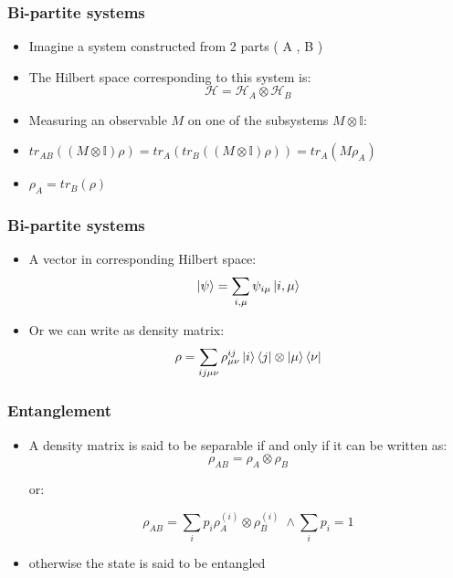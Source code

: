 \documentclass[11pt]{beamer}
\begin{document}
\begin{frame}
\frametitle{Bi-partite systems}

\begin{itemize}
 \item  Imagine a system constructed from 2 parts  ( A , B ) 
 \item  The Hilbert space corresponding to this system is:
    $$\mathcal{H} = \mathcal{H}_A \otimes \mathcal{H}_B $$
 \item  Measuring an observable $M$ on one of the subsystems $M \otimes     \mathbb{I} $:
 \item  $tr_{AB}((M \otimes \mathbb{I})\rho) = tr_A(tr_B((M \otimes \mathbb{I} )\rho)) = tr_A(M \rho_A)$
 \item $\rho_A  = tr_B(\rho)$
\end{itemize}

\end{frame}

\begin{frame}
\frametitle{Bi-partite systems}

\begin{itemize}
 \item  A vector in corresponding Hilbert space:
    $$\ket{\psi} = \sum_{i,\mu} \psi_{i\mu} \ket{i,\mu}$$
 \item  Or we can write as density matrix:
    $$\rho = \sum_{ij\mu\nu} \rho^{ij}_{\mu\nu} \ket{i}\bra{j} \otimes \ket{\mu}\bra{\nu} $$
\end{itemize}

\end{frame}

\begin{frame}
\frametitle{Entanglement}

\begin{itemize}
 \item  A density matrix is said to be separable if and only if it can be written as:
 $$\rho_{AB} = \rho_A \otimes \rho_B$$
 
 or:
 
 $$\rho_{AB} = \sum_i p_i \rho_A^{(i)} \otimes \rho_B ^{(i)} \; \wedge    \sum_i p_i =1$$
 \item  otherwise the state is said to be entangled

\end{itemize}

\end{frame}
\end{document}

